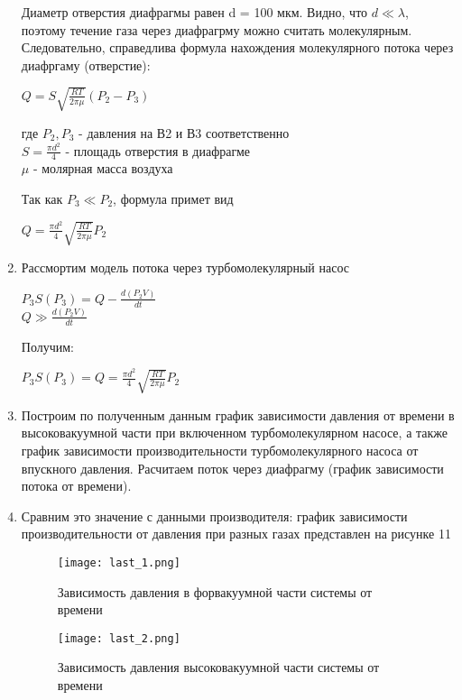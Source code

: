\documentclass[a4paper]{article}
\begin{document}
\begin{enumerate}
Диаметр отверстия диафрагмы равен d = 100 мкм. Видно, что $d \ll \lambda$, поэтому течение газа через диафрагрму можно считать молекулярным. Следовательно, справедлива формула нахождения молекулярного потока через диафргаму (отверстие):
\begin{center}
$Q = S\sqrt{\frac{RT}{2\pi\mu}}(P_2-P_3)$
\end{center}
где $P_2, P_3$ - давления на В2 и В3 соответственно\\
$S = \frac{\pi d^2}{4}$ - площадь отверстия в диафрагме\\
$\mu$ - молярная масса воздуха

Так как $P_3 \ll P_2$, формула примет вид
\begin{center}
$Q = \frac{\pi d^2}{4}\sqrt{\frac{RT}{2\pi\mu}}P_2$
\end{center}
\item Рассмортим модель потока через турбомолекулярный насос
\begin{center}
$P_3S(P_3) = Q - \frac{d(P_2V)}{dt}$\\
$Q \gg \frac{d(P_2V)}{dt}$
\end{center}
Получим:
\begin{center}
$P_3S(P_3) = Q = \frac{\pi d^2}{4}\sqrt{\frac{RT}{2\pi\mu}}P_2$
\end{center}

\item Построим по полученным данным график зависимости давления от времени в высоковакуумной части при включенном турбомолекулярном насосе, а также график зависимости производительности турбомолекулярного насоса от впускного давления. Расчитаем поток через диафрагму (график зависимости потока от времени).

\item Сравним это значение с данными производителя: график зависимости производительности от давления при разных газах представлен на рисунке 11\\

  \begin{figure}[h]
    \centering
    \texttt{[image: last\_1.png]}
    \caption{Зависимость давления в форвакуумной части системы от времени}
    \label{fig:vac}
\end{figure}


  \begin{figure}[h]
    \centering
    \texttt{[image: last\_2.png]}
    \caption{Зависимость давления высоковакуумной части системы от времени}
    \label{fig:vac}
\end{figure}


\end{enumerate}
\end{document}
